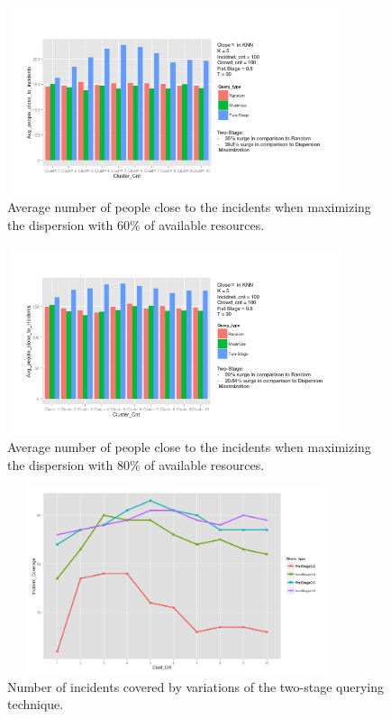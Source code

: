 \documentclass{acm_proc_article-sp}
\begin{document}
\begin{figure}[!htb]
\centering
   \includegraphics[width=10cm ,height=5.5cm]{figuresPng/FirstStageSixtyPerc}
   \caption{Average number of people close to the incidents when maximizing the dispersion with $60\%$ of available resources. }\label{fig: heatMap}
\end{figure}


\begin{figure}[!htb]
\centering
   \includegraphics[width=10cm ,height=5.5cm]{figuresPng/FirstStageEightyPerc}
   \caption{Average number of people close to the incidents when maximizing the dispersion with $80\%$ of available resources. }\label{fig: heatMap}
\end{figure}

\begin{figure}[!htb]
\centering
   \includegraphics[width=10cm ,height=5.5cm]{figuresPng/Coverage_Result}
   \caption{Number of incidents covered by variations of the two-stage querying technique. }\label{fig: heatMap}
\end{figure}
\end{document}
